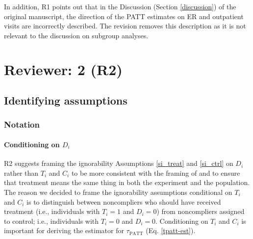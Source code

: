 \documentclass[hidelinks,12pt,letterpaper]{article}
\begin{document}

In addition, R1 points out that in the Discussion (Section \ref{discussion}) of the original manuscript, the direction of the PATT estimates on ER and outpatient visits are incorrectly described. The revision removes this description as it is not relevant to the discussion on subgroup analyses. 

\section{Reviewer: 2 (R2)}

\subsection{Identifying assumptions}

\subsubsection{Notation}

\paragraph{Conditioning on $D_i$}

R2 suggests framing the ignorability Assumptions \ref{si_treat} and \ref{si_ctrl} on $D_i$ rather than $T_i$ and $C_i$ to be more consistent with the framing of \citet{Hartman} and to ensure that treatment means the same thing in both the experiment and the population. The reason we decided to frame the ignorability assumptions conditional on $T_i$ and $C_i$ is to distinguish between noncompliers who should have received treatment (i.e., individuals with $T_i=1$ and $D_i = 0$) from noncompliers assigned to control; i.e., individuals with $T_i = 0$ and $D_i = 0$. Conditioning on $T_i$ and $C_i$ is important for deriving the estimator for $\tau_{\text{PATT}}$ (Eq. \ref{tpatt-est}). 
\end{document}
